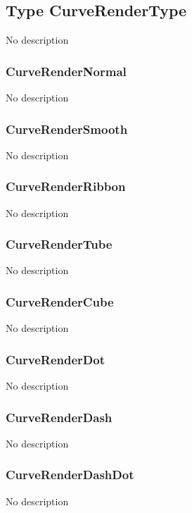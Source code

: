 \documentclass[10pt]{book}
\begin{document}
\subsection{Type CurveRenderType \label{T:CurveRenderType}}
No description

\subsubsection{CurveRenderNormal \label{T:CurveRenderType|CurveRenderNormal}}
No description

\subsubsection{CurveRenderSmooth \label{T:CurveRenderType|CurveRenderSmooth}}
No description

\subsubsection{CurveRenderRibbon \label{T:CurveRenderType|CurveRenderRibbon}}
No description

\subsubsection{CurveRenderTube \label{T:CurveRenderType|CurveRenderTube}}
No description

\subsubsection{CurveRenderCube \label{T:CurveRenderType|CurveRenderCube}}
No description

\subsubsection{CurveRenderDot \label{T:CurveRenderType|CurveRenderDot}}
No description

\subsubsection{CurveRenderDash \label{T:CurveRenderType|CurveRenderDash}}
No description

\subsubsection{CurveRenderDashDot \label{T:CurveRenderType|CurveRenderDashDot}}
No description
\end{document}
